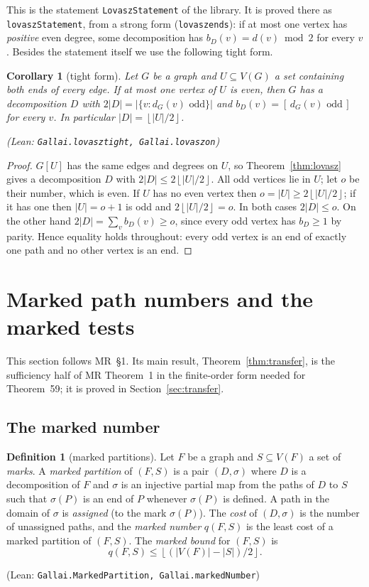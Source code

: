 \documentclass[11pt]{amsart}
\newtheorem{corollary}[theorem]{Corollary}
\theoremstyle{definition}
\newtheorem{definition}[theorem]{Definition}
\theoremstyle{remark}
\renewcommand{\_}{\oldunderscore\allowbreak}
\newcommand{\leanst}[1]{\par{\raggedright\small\textup{(Lean: \texttt{#1})}\par}}
\newcommand{\fl}[1]{\left\lfloor #1\right\rfloor}
\newcommand{\ind}[1]{[\,#1\,]}
\begin{document}
This is the statement \texttt{LovaszStatement} of the library. It is proved there as
\texttt{lovaszStatement}, from a strong form (\texttt{lovasz\_ends}): if at most one vertex has
\emph{positive} even degree, some decomposition has $b_D(v)=d(v)\bmod2$ for every $v$. Besides the
statement itself we use the following tight form.

\begin{corollary}[tight form]\label{cor:lovasz}
Let $G$ be a graph and $U\subseteq V(G)$ a set containing both ends of every edge. If at most one
vertex of $U$ is even, then $G$ has a decomposition $D$ with $2|D|=|\{v:d_G(v)\text{ odd}\}|$ and
$b_D(v)=\ind{d_G(v)\text{ odd}}$ for every $v$. In particular $|D|=\fl{|U|/2}$.
\leanst{Gallai.lovasz\_tight, Gallai.lovasz\_on}
\end{corollary}

\begin{proof}
$G[U]$ has the same edges and degrees on $U$, so Theorem~\ref{thm:lovasz} gives a decomposition $D$
with $2|D|\le 2\fl{|U|/2}$. All odd vertices lie in $U$; let $o$ be their number, which is even. If
$U$ has no even vertex then $o=|U|\ge 2\fl{|U|/2}$; if it has one then $|U|=o+1$ is odd and
$2\fl{|U|/2}=o$. In both cases $2|D|\le o$. On the other hand $2|D|=\sum_v b_D(v)\ge o$, since every
odd vertex has $b_D\ge1$ by parity. Hence equality holds throughout: every odd vertex is an end of
exactly one path and no other vertex is an end.
\end{proof}

\section{Marked path numbers and the marked tests}\label{sec:marked}

This section follows MR~\S1. Its main result, Theorem~\ref{thm:transfer}, is the sufficiency half
of MR Theorem~1 in the finite-order form needed for Theorem~59; it is proved in
Section~\ref{sec:transfer}.

\subsection{The marked number}

\begin{definition}[marked partitions]\label{def:marked}
Let $F$ be a graph and $S\subseteq V(F)$ a set of \emph{marks}. A \emph{marked partition} of
$(F,S)$ is a pair $(D,\sigma)$ where $D$ is a decomposition of $F$ and $\sigma$ is an injective
partial map from the paths of $D$ to $S$ such that $\sigma(P)$ is an end of $P$ whenever $\sigma(P)$
is defined. A path in the domain of $\sigma$ is \emph{assigned} (to the mark $\sigma(P)$). The
\emph{cost} of $(D,\sigma)$ is the number of unassigned paths, and the \emph{marked number}
$q(F,S)$ is the least cost of a marked partition of $(F,S)$. The \emph{marked bound} for $(F,S)$ is
\begin{equation}\label{eq:mb}
q(F,S)\le\fl{(|V(F)|-|S|)/2}.
\end{equation}
\leanst{Gallai.MarkedPartition, Gallai.markedNumber}
\end{definition}
\end{document}
